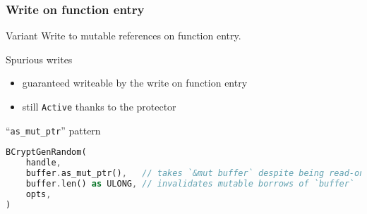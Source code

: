 

\begin{frame}[fragile, t]
    \frametitle{Write on function entry}

    \begin{exampleblock}{Variant}
        Write to mutable references on function entry.
    \end{exampleblock}

    \begin{block}{{\cmark} Spurious writes}
        \begin{itemize}
            \item guaranteed writeable by the write on function entry
            \item still \texttt{Active} thanks to the protector
        \end{itemize}
    \end{block}

    \begin{block}{{\xmark} ``\texttt{as\_mut\_ptr}'' pattern}
        \begin{lstlisting}[language=rust, basicstyle=\ttfamily\scriptsize]
BCryptGenRandom(
    handle,
    buffer.as_mut_ptr(),   // takes `&mut buffer` despite being read-only
    buffer.len() as ULONG, // invalidates mutable borrows of `buffer`
    opts,
)
        \end{lstlisting}
    \end{block}
\end{frame}


